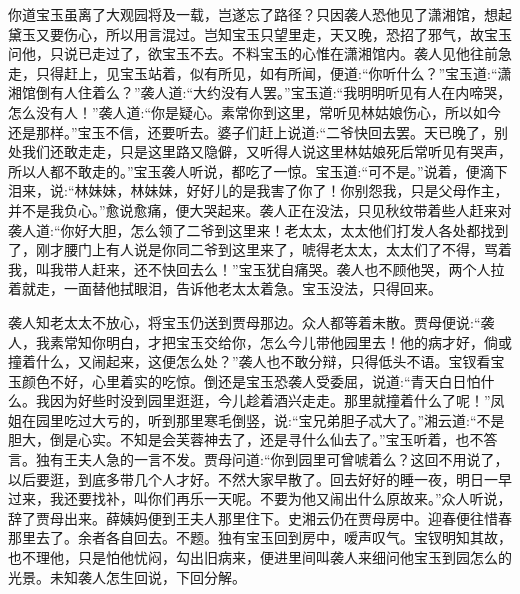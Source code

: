 \begin{parag}
    你道宝玉虽离了大观园将及一载，岂遂忘了路径？只因袭人恐他见了潇湘馆，想起黛玉又要伤心，所以用言混过。岂知宝玉只望里走，天又晚，恐招了邪气，故宝玉问他，只说已走过了，欲宝玉不去。不料宝玉的心惟在潇湘馆内。袭人见他往前急走，只得赶上，见宝玉站着，似有所见，如有所闻，便道:“你听什么？”宝玉道:“潇湘馆倒有人住着么？”袭人道:“大约没有人罢。”宝玉道:“我明明听见有人在内啼哭，怎么没有人！”袭人道:“你是疑心。素常你到这里，常听见林姑娘伤心，所以如今还是那样。”宝玉不信，还要听去。婆子们赶上说道:“二爷快回去罢。天已晚了，别处我们还敢走走，只是这里路又隐僻，又听得人说这里林姑娘死后常听见有哭声，所以人都不敢走的。”宝玉袭人听说，都吃了一惊。宝玉道:“可不是。”说着，便滴下泪来，说:“林妹妹，林妹妹，好好儿的是我害了你了！你别怨我，只是父母作主，并不是我负心。”愈说愈痛，便大哭起来。袭人正在没法，只见秋纹带着些人赶来对袭人道:“你好大胆，怎么领了二爷到这里来！老太太，太太他们打发人各处都找到了，刚才腰门上有人说是你同二爷到这里来了，唬得老太太，太太们了不得，骂着我，叫我带人赶来，还不快回去么！”宝玉犹自痛哭。袭人也不顾他哭，两个人拉着就走，一面替他拭眼泪，告诉他老太太着急。宝玉没法，只得回来。
\end{parag}


\begin{parag}
    袭人知老太太不放心，将宝玉仍送到贾母那边。众人都等着未散。贾母便说:“袭人，我素常知你明白，才把宝玉交给你，怎么今儿带他园里去！他的病才好，倘或撞着什么，又闹起来，这便怎么处？”袭人也不敢分辩，只得低头不语。宝钗看宝玉颜色不好，心里着实的吃惊。倒还是宝玉恐袭人受委屈，说道:“青天白日怕什么。我因为好些时没到园里逛逛，今儿趁着酒兴走走。那里就撞着什么了呢！”凤姐在园里吃过大亏的，听到那里寒毛倒竖，说:“宝兄弟胆子忒大了。”湘云道:“不是胆大，倒是心实。不知是会芙蓉神去了，还是寻什么仙去了。”宝玉听着，也不答言。独有王夫人急的一言不发。贾母问道:“你到园里可曾唬着么？这回不用说了，以后要逛，到底多带几个人才好。不然大家早散了。回去好好的睡一夜，明日一早过来，我还要找补，叫你们再乐一天呢。不要为他又闹出什么原故来。”众人听说，辞了贾母出来。薛姨妈便到王夫人那里住下。史湘云仍在贾母房中。迎春便往惜春那里去了。余者各自回去。不题。独有宝玉回到房中，嗳声叹气。宝钗明知其故，也不理他，只是怕他忧闷，勾出旧病来，便进里间叫袭人来细问他宝玉到园怎么的光景。未知袭人怎生回说，下回分解。
\end{parag}